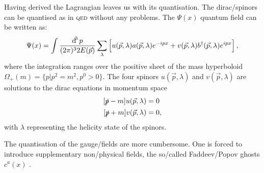 \documentclass[../../index.tex]{subfiles}
\begin{document}
Having derived the Lagrangian leaves us with its quantisation. The
dirac\-/spinors can be quantised as in \textsc{qed} without any problems. The
$\Psi(x)$ quantum field can be written as:
\begin{equation}
  \Psi(x) = \int \frac{\dif^3 p}{(2\pi)^3 2E(\vec p)} \sum_\lambda \left[ u(\vec p, \lambda) a(\vec p, \lambda) e^{-ipx} + v(\vec p, \lambda) b^\dagger (\vec p, \lambda) e^{ipx} \right],
\end{equation}
where the integration ranges over the positive sheet of the mass hyperboloid
$\Omega_+(m) = \{p \vert p^2 = m^2, p^0 > 0 \}$. The four spinors $u(\vec p,
\lambda)$ and $v(\vec p, \lambda)$ are solutions to the dirac equations in
momentum space
\begin{equation}
  \begin{split}
    [\slashed p - m]u(\vec p, \lambda) &= 0 \\
    [\slashed p + m]v(\vec p, \lambda) &= 0,
  \end{split}
\end{equation}
with $\lambda$ representing the helicity state of the spinors.

The quantisation of the gauge\-/fields are more cumbersome. One is forced to
introduce supplementary non\-/physical fields, the so\-/called Faddeev\-/Popov
ghosts $c^a(x)$ \cite{Faddeev1967}.
\end{document}

